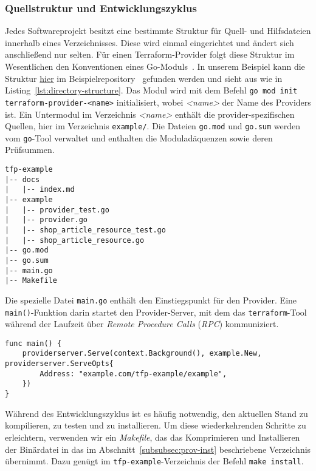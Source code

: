 \documentclass[paper=a4,11pt,numbers=noenddot]{article}
\begin{document}
\subsubsection{Quellstruktur und Entwicklungszyklus}
\label{subsubsec:prov-sourc-struct}

Jedes Softwareprojekt besitzt eine bestimmte Struktur für Quell- und Hilfsdateien innerhalb eines Verzeichnisses. Diese wird einmal eingerichtet und ändert sich anschließend nur selten. Für einen Terraform-Provider folgt diese Struktur im Wesentlichen den Konventionen eines Go-Moduls~\autocite{noauthor_go_modules_nodate}. In unserem Beispiel kann die Struktur \href{https://github.com/ecky-l/terraform-provider-example/tree/main/src/tfp-example}{hier} im Beispielrepository~\autocite{ecky-l_terraform-provider-example_nodate} gefunden werden und sieht aus wie in Listing~\ref{lst:directory-structure}. Das Modul wird mit dem Befehl \verb'go mod init terraform-provider-<name>' initialisiert, wobei \emph{<name>} der Name des Providers ist. Ein Untermodul im Verzeichnis \emph{<name>} enthält die provider-spezifischen Quellen, hier im Verzeichnis \verb'example/'. Die Dateien \verb'go.mod' und \verb'go.sum' werden vom \verb'go'-Tool verwaltet und enthalten die Moduladäquenzen sowie deren Prüfsummen.

\begin{lstlisting}[label=lst:directory-structure]
tfp-example
|-- docs
|   |-- index.md
|-- example
|   |-- provider_test.go
|   |-- provider.go
|   |-- shop_article_resource_test.go
|   |-- shop_article_resource.go
|-- go.mod
|-- go.sum
|-- main.go
|-- Makefile
\end{lstlisting}


Die spezielle Datei \verb'main.go' enthält den Einstiegspunkt für den Provider. Eine \verb'main()'-Funktion darin startet den Provider-Server, mit dem das \verb'terraform'-Tool während der Laufzeit über \emph{Remote Procedure Calls} (\emph{RPC}) kommuniziert.

\begin{lstlisting}[label=lst:main]
func main() {
    providerserver.Serve(context.Background(), example.New, providerserver.ServeOpts{
        Address: "example.com/tfp-example/example",
    })
}
\end{lstlisting}

Während des Entwicklungszyklus ist es häufig notwendig, den aktuellen Stand zu kompilieren, zu testen und zu installieren. Um diese wiederkehrenden Schritte zu erleichtern, verwenden wir ein \emph{Makefile}, das das Komprimieren und Installieren der Binärdatei in das im Abschnitt~\ref{subsubsec:prov-inst} beschriebene Verzeichnis übernimmt. Dazu genügt im \verb'tfp-example'-Verzeichnis der Befehl \verb'make install'.
\end{document}
